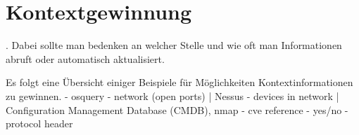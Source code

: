 \section{Kontextgewinnung}
.
Dabei sollte man bedenken an welcher Stelle und wie oft man Informationen abruft oder automatisch aktualisiert. \cite{perera_context_2014}

Es folgt eine Übersicht einiger Beispiele für Möglichkeiten Kontextinformationen zu gewinnen. 
- osquery
- network (open ports) | Nessus
- devices in network | Configuration Management Database (CMDB), nmap   
- cve reference - yes/no
- protocol header

